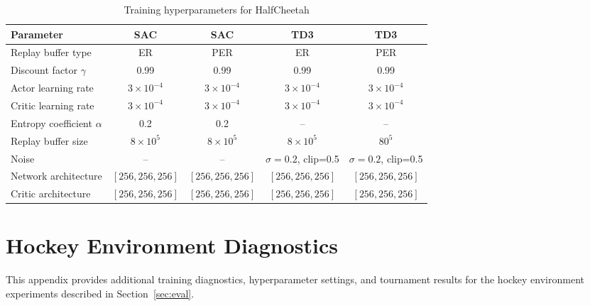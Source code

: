 \documentclass[11pt]{article}
\begin{document}
\begin{table}[htbp]
\renewcommand{\arraystretch}{0.85}
\centering
\caption{Training hyperparameters for HalfCheetah}
\vspace{-0.3cm}
\begin{tabular}{lcccc}
\toprule
\textbf{Parameter} 
& \textbf{SAC} 
& \textbf{SAC}
& \textbf{TD3}
& \textbf{TD3} \\
\midrule

Replay buffer type
& ER & PER & ER & PER \\


Discount factor $\gamma$
& 0.99 & 0.99 & 0.99 & 0.99 \\

Actor learning rate
& $3\times10^{-4}$ & $3\times10^{-4}$ 
& $3\times10^{-4}$ & $3\times10^{-4}$ \\

Critic learning rate
& $3\times10^{-4}$ & $3\times10^{-4}$ 
& $3\times10^{-4}$ & $3\times10^{-4}$ \\

Entropy coefficient $\alpha$
& 0.2 & 0.2 & -- & -- \\

Replay buffer size
& $8\times10^5$ & $8\times10^5$ & $8\times10^5$ & $80^5$ \\

Noise
& -- & -- & 
$\sigma=0.2$, \newline clip=0.5 
& $\sigma=0.2$, \newline clip=0.5 \\

Network architecture
& $[256,256, 256]$ & $[256,256, 256]$ 
& $[256,256, 256]$ & $[256,256,256]$ \\

Critic architecture
& $[256,256,256]$ & $[256,256,256]$ 
& $[256,256,256]$ & $[256,256,256]$ \\

\bottomrule
\end{tabular}
\end{table}


\newpage

\section{Hockey Environment Diagnostics}

This appendix provides additional training diagnostics, hyperparameter settings, and 
tournament results for the hockey environment experiments described in 
Section~\ref{sec:eval}.
\end{document}
